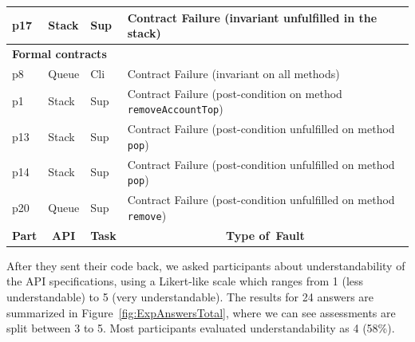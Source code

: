 \begin{table}
\begin{adjustbox}{width=\textwidth}
\begin{tabular}{|l|l|l|l|}
\hline
p17                                        & Stack                             & Sup                                & Contract Failure (invariant unfulfilled in the stack)                                     \\ 
\hline
\multicolumn{4}{|l|}{\textbf{Formal contracts} }                                                                                                                                                                \\ 
\hline
p8                                         & Queue                             & Cli                                & Contract Failure (invariant on all methods)                                               \\ 
\hline
p1                                         & Stack                             & Sup                                & Contract Failure (post-condition on method \texttt{removeAccountTop})    \\ 
\hline
p13                                        & Stack                             & Sup                                & Contract Failure (post-condition unfulfilled on method \texttt{pop})     \\ 
\hline
p14                                        & Stack                             & Sup                                & Contract Failure (post-condition unfulfilled on method \texttt{pop})     \\ 
\hline
p20                                        & Queue                             & Sup                                & Contract Failure (post-condition unfulfilled on method \texttt{remove})  \\ 
\hline\hline
\multicolumn{1}{|c|}{\textbf{Part}} & \multicolumn{1}{c|}{\textbf{API}} & \multicolumn{1}{c|}{\textbf{Task}} & \multicolumn{1}{c|}{\textbf{Type of~Fault}}                                               \\
\hline
\end{tabular}
\end{adjustbox}
\end{table}

After they sent their code back, we asked participants about understandability of the API specifications, using a Likert-like scale which ranges from 1 (less understandable) to 5 (very understandable). The results for 24 answers are summarized in Figure~\ref{fig:ExpAnswersTotal}, where we can see assessments are split between 3 to 5. Most participants evaluated understandability as 4 (58\%).



